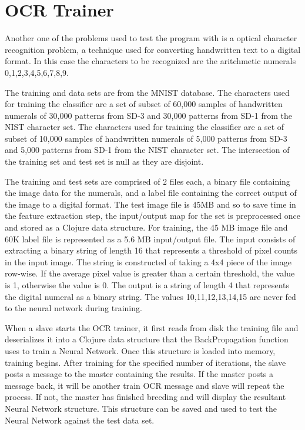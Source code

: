 \chapter[OCR Trainer]{OCR Trainer}
Another one of the problems used to test the program with is a optical character recognition problem, a technique used for converting handwritten text to a digital format. In this case the characters to be recognized are the aritchmetic numerals 0,1,2,3,4,5,6,7,8,9.

The training and data sets are from the MNIST database\cite{mnist}.
The characters used for training the classifier are a set of subset of 60,000 samples of handwritten numerals of 30,000 patterns from SD-3 and 30,000 patterns from SD-1 from the NIST character set. The characters used for training the classifier are a set of subset of 10,000 samples of handwritten numerals of 5,000 patterns from SD-3 and 5,000 patterns from SD-1 from the NIST character set. The intersection of the training set and test set is null as they are disjoint.

The training and test sets are comprised of 2 files each, a binary file containing the image data for the numerals, and a label file containing the correct output of the image to a digital format. The test image file is 45MB and so to save time in the feature extraction step, the input/output map for the set is preprocessed once and stored as a Clojure data structure. For training, the 45 MB image file and 60K label file is represented as a 5.6 MB input/output file. The input consists of extracting a binary string of length 16 that represents a threshold of pixel counts in the input image. The string is constructed of taking a 4x4 piece of the image row-wise. If the average pixel value is greater than a certain threshold, the value is 1, otherwise the value is 0. The output is a string of length 4 that represents the digital numeral as a binary string. The values 10,11,12,13,14,15 are never fed to the neural network during training.

When a slave starts the OCR trainer, it first reads from disk the training file and deserializes it into a Clojure data structure that the BackPropagation function uses to train a Neural Network. Once this structure is loaded into memory, training begins. After training for the specified number of iterations, the slave posts a message to the master containing the results. If the master posts a message back, it will be another train OCR message and slave will repeat the process. If not, the master has finished breeding and will display the resultant Neural Network structure. This structure can be saved and used to test the Neural Network against the test data set.

  

